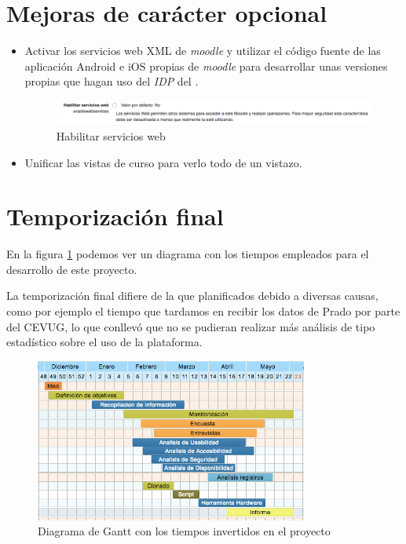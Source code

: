 \section{Mejoras de carácter opcional}
\begin{itemize}
	\item Activar los servicios web XML de \textit{moodle} y utilizar el código fuente de las aplicación Android e iOS propias de \textit{moodle} para desarrollar unas versiones propias que hagan uso del \textit{IDP} del .
\begin{figure}[H]
\centering
\includegraphics[width=1.0\textwidth]{../screenshots/habilitar_serviciosweb}
\caption{Habilitar servicios web}
\end{figure}

	\item Unificar las vistas de curso para verlo todo de un vistazo.

\end{itemize}

\section{Temporización final}

En la figura \ref{fig:temporizacion2} podemos ver un diagrama con los tiempos empleados para el desarrollo de este proyecto.

\bigskip
La temporización final difiere de la que planificados debido a diversas causas, como por ejemplo el tiempo que tardamos en recibir los datos de Prado por parte del CEVUG, lo que conllevó que no se pudieran realizar más análisis de tipo estadístico sobre el uso de la plataforma.

\begin{figure}[H]
\centering
\includegraphics[width=0.8\textwidth]{../screenshots/temporizacion2}
\caption{Diagrama de Gantt con los tiempos invertidos en el proyecto}
\label{fig:temporizacion2}
\end{figure}

